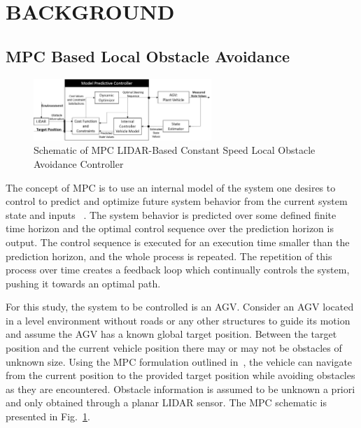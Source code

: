 \documentclass[12pt,twocolumn]{article}
\begin{document}

\section{BACKGROUND}\label{s:background}

\subsection{MPC Based Local Obstacle Avoidance }\label{MPC}

\begin{figure}
	\centering
	\includegraphics[width=0.6\textwidth]{Figs/MPCBlockDiagram.png}
	\caption{{\small Schematic of MPC LIDAR-Based Constant Speed Local Obstacle Avoidance Controller}}    
	\label{fig:MPC_schematic}
\end{figure}

The concept of MPC is to use an internal model of the system one desires to control to predict and optimize future system behavior from the current system state and inputs ~\cite{Allgower&Findeisen2002}. The system behavior is predicted over some defined finite time horizon and the optimal control sequence over the prediction horizon is output. The control sequence is executed for an execution time smaller than the prediction horizon, and the whole process is repeated. The repetition of this process over time creates a feedback loop which continually controls the system, pushing it towards an optimal path.

For this study, the system to be controlled is an AGV. Consider an AGV located in a level environment without roads or any other structures to guide its motion and assume the AGV has a known global target position. Between the target position and the current vehicle position there may or may not be obstacles of unknown size. Using the MPC formulation outlined in~\cite{ModelFidelity2016}, the vehicle can navigate from the current position to the provided target position while avoiding obstacles as they are encountered. Obstacle information is assumed to be unknown a priori and only obtained through a planar LIDAR sensor. The MPC schematic is presented in Fig.~\ref{fig:MPC_schematic}.
%
\end{document}
